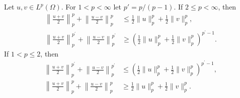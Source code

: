 \begin{theorem}\label{thm:2.38}
  Let $u,v\in L^p(\Omega)$. For $1<p<\infty$ let $p' = p/(p-1)$.
  If $2\leq p<\infty$, then
  \begin{align}
    \left\|\frac{u+v}{2}\right\|_p^p+\left\|\frac{u-v}{2}\right\|_p^p
    & \leq \frac{1}{2}\|u\|_p^p+\frac{1}{2}\|v\|_p^p, \label{eq:2.30} \\
    \left\|\frac{u+v}{2}\right\|_p^{p^{\prime}}+\left\|\frac{u-v}{2}\right\|_p^{p^{\prime}} 
    & \geq\left(\frac{1}{2}\|u\|_p^p+\frac{1}{2}\|v\|_p^p\right)^{p^{\prime}-1}. \label{eq:2.31}
  \end{align}
  If $1<p \leq 2$, then
  \begin{align}
    \left\|\frac{u+v}{2}\right\|_p^{p^{\prime}}+\left\|\frac{u-v}{2}\right\|_p^{p^{\prime}} 
    & \leq\left(\frac{1}{2}\|u\|_p^p+\frac{1}{2}\|v\|_p^p\right)^{p^{\prime}-1}, \label{eq:2.32} \\
    \left\|\frac{u+v}{2}\right\|_p^p+\left\|\frac{u-v}{2}\right\|_p^p 
    & \geq \frac{1}{2}\|u\|_p^p+\frac{1}{2}\|v\|_p^p. \label{eq:2.33}
  \end{align}
\end{theorem}

